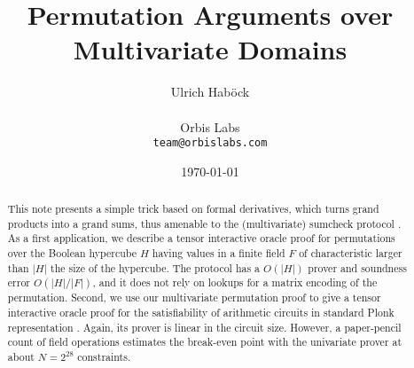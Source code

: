 \documentclass[11pt]{article}
\author{%
Ulrich Hab{\"o}ck
\\\\
Orbis Labs
\\
\texttt{team@orbislabs.com}
}
\theoremstyle{definition}
\theoremstyle{remark}
\begin{document}
\title{%
Permutation Arguments over Multivariate Domains 
%
}
\date{%
\today
}
\maketitle



\begin{abstract}
This note presents a simple trick based on formal derivatives, which turns grand products into a grand sums, thus amenable to the (multivariate) sumcheck protocol \cite{sumcheck}.
As a first application, we describe a tensor interactive oracle proof for permutations over the Boolean hypercube $H$ having values in a finite field $F$ of characteristic larger than $|H|$ the size of the hypercube. 
The protocol has a $O(|H|)$ prover and soundness error $O(|H|/|F|)$, and it does not rely on lookups for a matrix encoding of the permutation.
Second, we use our multivariate permutation proof to give a tensor interactive oracle proof for the satisfiability of arithmetic circuits in standard Plonk representation \cite{Plonk}.
Again, its prover is  linear in the circuit size. 
However, a paper-pencil count of field operations estimates the break-even point with the univariate prover at about $N=2^{28}$ constraints.
%
\end{abstract}


 \tableofcontents

\end{document}
